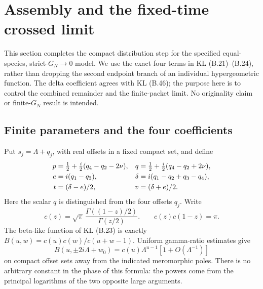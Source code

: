 \section{Assembly and the fixed-time crossed limit}
\label{sec:assembly}
This section completes the compact distribution step for the specified
equal-species, strict-$G_N\to0$ model. We use the exact four terms in
KL (B.21)--(B.24), rather than dropping the second endpoint branch of
an individual hypergeometric function. The delta coefficient agrees with
KL (B.46); the purpose here is to control the combined remainder and the
finite-packet limit. No originality claim or finite-$G_N$ result is intended.

\subsection{Finite parameters and the four coefficients}
Put $s_j=\Lambda+q_j$, with real offsets in a fixed compact set, and define
\begin{align}
 p&=\tfrac12+\tfrac i2(q_4-q_2-2\nu),&
 q&=\tfrac12+\tfrac i2(q_4-q_2+2\nu),\notag\\
 e&=i(q_1-q_3),& \delta&=i(q_1-q_2+q_3-q_4),\notag\\
 t&=(\delta-e)/2,&v&=(\delta+e)/2.
 \label{eq:assembly-vars}
\end{align}
Here the scalar $q$ is distinguished from the four offsets $q_j$.
Write
\begin{equation}
 c(z)=\sqrt\pi\,\frac{\Gamma((1-z)/2)}{\Gamma(z/2)}.
 \qquad c(z)c(1-z)=\pi.
 \label{eq:assembly-c}
\end{equation}
The beta-like function of KL (B.23) is exactly
$B(u,w)=c(u)c(w)/c(u+w-1)$. Uniform gamma-ratio estimates give
\begin{equation}
 B(u,\pm2i\Lambda+w_0)
 =c(u)\Lambda^{u-1}[1+O(\Lambda^{-1})]
 \label{eq:assembly-beta-asym}
\end{equation}
on compact offset sets away from the indicated meromorphic poles.
There is no arbitrary constant in the phase of this formula: the powers
come from the principal logarithms of the two opposite large arguments.

